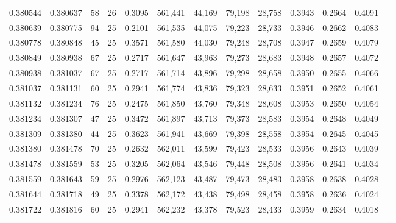 \begin{tabular}{rrrrrrrrrrrrr}
0.380544 & 0.380637 &    58 &  26 &                                     0.3095 & 561,441 &  44,169 &  79,198 &  28,758 & 0.3943 & 0.2664 & 0.4091 \\
0.380639 & 0.380775 &    94 &  25 &                                     0.2101 & 561,535 &  44,075 &  79,223 &  28,733 & 0.3946 & 0.2662 & 0.4083 \\
0.380778 & 0.380848 &    45 &  25 &                                     0.3571 & 561,580 &  44,030 &  79,248 &  28,708 & 0.3947 & 0.2659 & 0.4079 \\
0.380849 & 0.380938 &    67 &  25 &                                     0.2717 & 561,647 &  43,963 &  79,273 &  28,683 & 0.3948 & 0.2657 & 0.4072 \\
0.380938 & 0.381037 &    67 &  25 &                                     0.2717 & 561,714 &  43,896 &  79,298 &  28,658 & 0.3950 & 0.2655 & 0.4066 \\
0.381037 & 0.381131 &    60 &  25 &                                     0.2941 & 561,774 &  43,836 &  79,323 &  28,633 & 0.3951 & 0.2652 & 0.4061 \\
0.381132 & 0.381234 &    76 &  25 &                                     0.2475 & 561,850 &  43,760 &  79,348 &  28,608 & 0.3953 & 0.2650 & 0.4054 \\
0.381234 & 0.381307 &    47 &  25 &                                     0.3472 & 561,897 &  43,713 &  79,373 &  28,583 & 0.3954 & 0.2648 & 0.4049 \\
0.381309 & 0.381380 &    44 &  25 &                                     0.3623 & 561,941 &  43,669 &  79,398 &  28,558 & 0.3954 & 0.2645 & 0.4045 \\
0.381380 & 0.381478 &    70 &  25 &                                     0.2632 & 562,011 &  43,599 &  79,423 &  28,533 & 0.3956 & 0.2643 & 0.4039 \\
0.381478 & 0.381559 &    53 &  25 &                                     0.3205 & 562,064 &  43,546 &  79,448 &  28,508 & 0.3956 & 0.2641 & 0.4034 \\
0.381559 & 0.381643 &    59 &  25 &                                     0.2976 & 562,123 &  43,487 &  79,473 &  28,483 & 0.3958 & 0.2638 & 0.4028 \\
0.381644 & 0.381718 &    49 &  25 &                                     0.3378 & 562,172 &  43,438 &  79,498 &  28,458 & 0.3958 & 0.2636 & 0.4024 \\
0.381722 & 0.381816 &    60 &  25 &                                     0.2941 & 562,232 &  43,378 &  79,523 &  28,433 & 0.3959 & 0.2634 & 0.4018 \\

\end{tabular}
